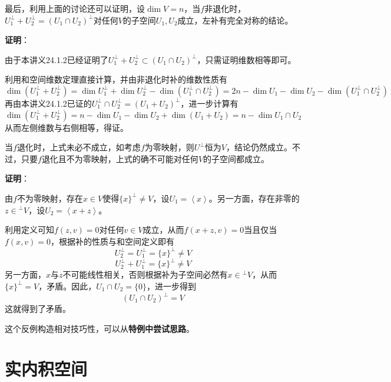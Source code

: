 \documentclass[a4paper,UTF8,fontset=windows,AutoFakeBold]{ctexart}
\newcommand*{\note}{\noindent *}
\newcommand{\proo}[1]{{\vspace{5pt}\kaishu\noindent\textbf{证明}：\vspace{-3pt}
\begin{compactitem}
    \item[] #1
\end{compactitem}
}}
\begin{document}
最后，利用上面的讨论还可以证明，设$\dim V=n$，当$f$非退化时，$U_1^\bot+U_2^\bot=(U_1\cap U_2)^\bot$对任何$V$的子空间$U_1,U_2$成立，左补有完全对称的结论。

\proo{       
    由于本讲义24.1.2已经证明了$U_1^\bot+U_2^\bot\subset(U_1\cap U_2)^\bot$，只需证明维数相等即可。

    利用和空间维数定理直接计算，并由非退化时补的维数性质有
    $$\dim(U_1^\bot+U_2^\bot)=\dim U_1^\bot+\dim U_2^\bot-\dim(U_1^\bot\cap U_2^\bot)=2n-\dim U_1-\dim U_2-\dim(U_1^\bot\cap U_2^\bot)$$
    再由本讲义24.1.2已证的$U_1^\bot\cap U_2^\bot=(U_1+U_2)^\bot$，进一步计算有
    $$\dim(U_1^\bot+U_2^\bot)=n-\dim U_1-\dim U_2+\dim(U_1+U_2)=n-\dim U_1\cap U_2$$
    从而左侧维数与右侧相等，得证。
}

当$f$退化时，上式未必不成立，如考虑$f$为零映射，则$U^\bot$恒为$V$，结论仍然成立。不过，只要$f$退化且不为零映射，上式的确不可能对任何$V$的子空间都成立。

\proo{
    由$f$不为零映射，存在$x\in V$使得$\{x\}^\bot\ne V$，设$U_1=\left<x\right>$。另一方面，存在非零的$z\in{}^\bot V$，设$U_2=\left<x+z\right>$。

    利用定义可知$f(z,v)=0$对任何$v\in V$成立，从而$f(x+z,v)=0$当且仅当$f(x,v)=0$，根据补的性质与和空间定义即有
    $$U_2^\bot=U_1^\bot=\{x\}^\bot\ne V$$
    $$U_2^\bot+U_1^\bot=\{x\}^\bot\ne V$$
    另一方面，$x$与$z$不可能线性相关，否则根据补为子空间必然有$x\in{}^\bot V$，从而$\{x\}^\bot=V$，矛盾。因此，$U_1\cap U_2=\{0\}$，进一步得到
    $$(U_1\cap U_2)^\bot=V$$
    这就得到了矛盾。

    \note 这个反例构造相对技巧性，可以从\textbf{特例中尝试思路}。
}

\section{实内积空间}
\end{document}
